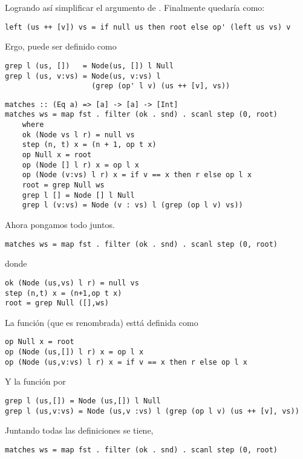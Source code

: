 Logrando así simplificar el argumento de . Finalmente quedaría  como:
\begin{verbatim}
left (us ++ [v]) vs = if null us then root else op' (left us vs) v
\end{verbatim}

Ergo,  puede ser definido como
\begin{verbatim}
grep l (us, [])   = Node(us, []) l Null
grep l (us, v:vs) = Node(us, v:vs) l
                    (grep (op' l v) (us ++ [v], vs))
\end{verbatim}

\begin{verbatim}
matches :: (Eq a) => [a] -> [a] -> [Int]
matches ws = map fst . filter (ok . snd) . scanl step (0, root)
    where
    ok (Node vs l r) = null vs
    step (n, t) x = (n + 1, op t x)
    op Null x = root
    op (Node [] l r) x = op l x
    op (Node (v:vs) l r) x = if v == x then r else op l x
    root = grep Null ws
    grep l [] = Node [] l Null
    grep l (v:vs) = Node (v : vs) l (grep (op l v) vs))
\end{verbatim}

Ahora pongamos todo juntos.
\begin{verbatim}
matches ws = map fst . filter (ok . snd) . scanl step (0, root)
\end{verbatim}

donde

\begin{verbatim}
ok (Node (us,vs) l r) = null vs
step (n,t) x = (n+1,op t x)
root = grep Null ([],ws)
\end{verbatim}

La función  (que es  renombrada) esttá definida como
\begin{verbatim}
op Null x = root
op (Node (us,[]) l r) x = op l x
op (Node (us,v:vs) l r) x = if v == x then r else op l x
\end{verbatim}

Y la función  por
\begin{verbatim}
grep l (us,[]) = Node (us,[]) l Null
grep l (us,v:vs) = Node (us,v :vs) l (grep (op l v) (us ++ [v], vs))
\end{verbatim}

Juntando todas las definiciones se tiene,

\begin{verbatim}
matches ws = map fst . filter (ok . snd) . scanl step (0, root)
\end{verbatim}

